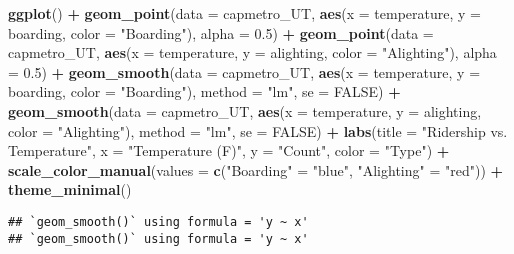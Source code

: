 \documentclass[
]{article}
\newenvironment{Shaded}{\begin{snugshade}}{\end{snugshade}}
\newcommand{\AttributeTok}[1]{\textcolor[rgb]{0.13,0.29,0.53}{#1}}
\newcommand{\ConstantTok}[1]{\textcolor[rgb]{0.56,0.35,0.01}{#1}}
\newcommand{\FloatTok}[1]{\textcolor[rgb]{0.00,0.00,0.81}{#1}}
\newcommand{\FunctionTok}[1]{\textcolor[rgb]{0.13,0.29,0.53}{\textbf{#1}}}
\newcommand{\NormalTok}[1]{#1}
\newcommand{\OtherTok}[1]{\textcolor[rgb]{0.56,0.35,0.01}{#1}}
\newcommand{\SpecialCharTok}[1]{\textcolor[rgb]{0.81,0.36,0.00}{\textbf{#1}}}
\newcommand{\StringTok}[1]{\textcolor[rgb]{0.31,0.60,0.02}{#1}}
\begin{document}
\begin{Shaded}
\begin{Highlighting}[]
\FunctionTok{ggplot}\NormalTok{() }\SpecialCharTok{+}
  \FunctionTok{geom\_point}\NormalTok{(}\AttributeTok{data =}\NormalTok{ capmetro\_UT, }\FunctionTok{aes}\NormalTok{(}\AttributeTok{x =}\NormalTok{ temperature, }\AttributeTok{y =}\NormalTok{ boarding, }\AttributeTok{color =} \StringTok{"Boarding"}\NormalTok{), }\AttributeTok{alpha =} \FloatTok{0.5}\NormalTok{) }\SpecialCharTok{+}
  \FunctionTok{geom\_point}\NormalTok{(}\AttributeTok{data =}\NormalTok{ capmetro\_UT, }\FunctionTok{aes}\NormalTok{(}\AttributeTok{x =}\NormalTok{ temperature, }\AttributeTok{y =}\NormalTok{ alighting, }\AttributeTok{color =} \StringTok{"Alighting"}\NormalTok{), }\AttributeTok{alpha =} \FloatTok{0.5}\NormalTok{) }\SpecialCharTok{+}
  \FunctionTok{geom\_smooth}\NormalTok{(}\AttributeTok{data =}\NormalTok{ capmetro\_UT, }\FunctionTok{aes}\NormalTok{(}\AttributeTok{x =}\NormalTok{ temperature, }\AttributeTok{y =}\NormalTok{ boarding, }\AttributeTok{color =} \StringTok{"Boarding"}\NormalTok{), }\AttributeTok{method =} \StringTok{"lm"}\NormalTok{, }\AttributeTok{se =} \ConstantTok{FALSE}\NormalTok{) }\SpecialCharTok{+}
  \FunctionTok{geom\_smooth}\NormalTok{(}\AttributeTok{data =}\NormalTok{ capmetro\_UT, }\FunctionTok{aes}\NormalTok{(}\AttributeTok{x =}\NormalTok{ temperature, }\AttributeTok{y =}\NormalTok{ alighting, }\AttributeTok{color =} \StringTok{"Alighting"}\NormalTok{), }\AttributeTok{method =} \StringTok{"lm"}\NormalTok{, }\AttributeTok{se =} \ConstantTok{FALSE}\NormalTok{) }\SpecialCharTok{+}
  \FunctionTok{labs}\NormalTok{(}\AttributeTok{title =} \StringTok{"Ridership vs. Temperature"}\NormalTok{,}
       \AttributeTok{x =} \StringTok{"Temperature (F)"}\NormalTok{,}
       \AttributeTok{y =} \StringTok{"Count"}\NormalTok{,}
       \AttributeTok{color =} \StringTok{"Type"}\NormalTok{) }\SpecialCharTok{+}
  \FunctionTok{scale\_color\_manual}\NormalTok{(}\AttributeTok{values =} \FunctionTok{c}\NormalTok{(}\StringTok{"Boarding"} \OtherTok{=} \StringTok{"blue"}\NormalTok{, }\StringTok{"Alighting"} \OtherTok{=} \StringTok{"red"}\NormalTok{)) }\SpecialCharTok{+}
  \FunctionTok{theme\_minimal}\NormalTok{()}
\end{Highlighting}
\end{Shaded}

\begin{verbatim}
## `geom_smooth()` using formula = 'y ~ x'
## `geom_smooth()` using formula = 'y ~ x'
\end{verbatim}
\end{document}
